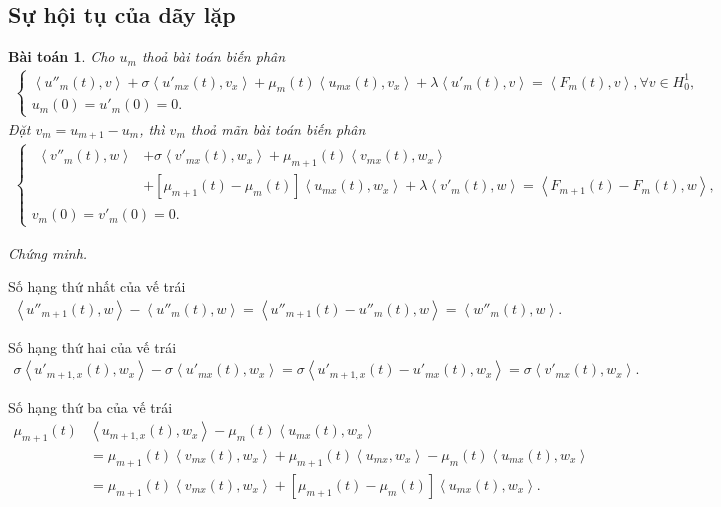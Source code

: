 \documentclass[12pt,a4paper]{article}
\newtheorem{theorem}{Bài toán}[section]
\theoremstyle{definition}
\begin{document}
\subsection{Sự hội tụ của dãy lặp}

\begin{theorem}
    Cho $u_m$ thoả bài toán biến phân
    \begin{align*}
    \begin{cases}
        \left<u''_m(t),v\right> + \sigma \left<u'_{mx}(t),v_x\right> + \mu_m(t) \left<u_{mx}(t),v_x\right> + \lambda \left<u'_m(t),v\right> = \left<F_m(t),v\right>, \forall v \in H^1_0, \\
        u_m(0) = u'_m(0) = 0.
    \end{cases}
    \end{align*}
    Đặt $v_m = u_{m+1} - u_m$, thì $v_m$ thoả mãn bài toán biến phân
    \begin{align*}
    \begin{cases}
        \begin{aligned}
            \left<v''_m(t),w\right> &+ \sigma \left<v'_{mx}(t),w_x\right> + \mu_{m+1}(t) \left<v_{mx}(t),w_x\right> \\
            &+ [\mu_{m+1}(t) - \mu_m(t)] \left<u_{mx}(t),w_x\right> + \lambda \left<v'_m(t),w\right> = \left<F_{m+1}(t) - F_m(t),w\right>,
        \end{aligned}\\
        v_m(0) = v'_m(0) = 0.
    \end{cases}
    \end{align*}
\end{theorem}

\textit{Chứng minh.}

Số hạng thứ nhất của vế trái
\begin{align*}
    \left<u''_{m+1}(t),w\right> - \left<u''_m(t),w\right> = \left<u''_{m+1}(t) - u''_m(t),w\right> = \left<w''_m(t),w\right>.
\end{align*}

Số hạng thứ hai của vế trái
\begin{align*}
    \sigma \left<u'_{m+1,x}(t),w_x\right> - \sigma \left<u'_{mx}(t),w_x\right> = \sigma \left<u'_{m+1,x}(t) - u'_{mx}(t),w_x\right> = \sigma \left<v'_{mx}(t),w_x\right>.
\end{align*}

Số hạng thứ ba của vế trái
\begin{align*}
    \mu_{m+1}(t) &\left<u_{m+1,x}(t),w_x\right> - \mu_m(t) \left<u_{mx}(t),w_x\right> \\
    &= \mu_{m+1}(t) \left<v_{mx}(t),w_x\right> + \mu_{m+1}(t)\left<u_{mx},w_x\right> - \mu_m(t) \left<u_{mx}(t),w_x\right> \\
    &= \mu_{m+1}(t) \left<v_{mx}(t),w_x\right> + [ \mu_{m+1}(t) - \mu_m(t)]\left<u_{mx}(t),w_x\right>.
\end{align*}
\end{document}
